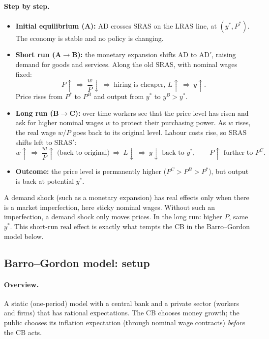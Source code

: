 \paragraph{Step by step.}
\begin{itemize}
  \item \textbf{Initial equilibrium (A):} AD crosses SRAS on the LRAS line, at $(y^*,P^*)$. The economy is stable and no policy is changing.
  \item \textbf{Short run (A$\to$B):} the monetary expansion shifts AD to AD$'$, raising demand for goods and services. Along the old SRAS, with nominal wages fixed:
  \[
  P\uparrow\ \Rightarrow\ \frac{w}{P}\downarrow\ \Rightarrow\ \text{hiring is cheaper, } L\uparrow\ \Rightarrow\ y\uparrow .
  \]
  Price rises from $P^*$ to $P^B$ and output from $y^*$ to $y^B>y^*$.
  \item \textbf{Long run (B$\to$C):} over time workers see that the price level has risen and ask for higher nominal wages $w$ to protect their purchasing power. As $w$ rises, the real wage $w/P$ goes back to its original level. Labour costs rise, so SRAS shifts left to SRAS$'$:
  \[
  w\uparrow\ \Rightarrow\ \frac{w}{P}\uparrow \text{ (back to original)}\ \Rightarrow\ L\downarrow\ \Rightarrow\ y\downarrow \text{ back to } y^*,\qquad P\uparrow \text{ further to } P^C .
  \]
  \item \textbf{Outcome:} the price level is permanently higher ($P^C>P^B>P^*$), but output is back at potential $y^*$.
\end{itemize}
\begin{tipbox}
A demand shock (such as a monetary expansion) has real effects only when there is a market imperfection, here sticky nominal wages. Without such an imperfection, a demand shock only moves prices. In the long run: higher $P$, same $y^*$. This short-run real effect is exactly what tempts the CB in the Barro--Gordon model below.
\end{tipbox}

\subsection{Barro--Gordon model: setup }

\paragraph{Overview.} A static (one-period) model with a central bank and a private sector (workers and firms) that has rational expectations. The CB chooses money growth; the public chooses its inflation expectation (through nominal wage contracts) \emph{before} the CB acts.

